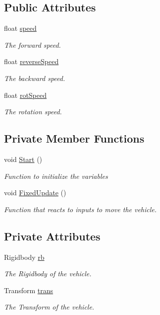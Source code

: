 \subsection*{Public Attributes}
\begin{DoxyCompactItemize}
\item 
float \hyperlink{classControls_a13ff9c0c0ed45cd20148f4040d1c2f2a}{speed}
\begin{DoxyCompactList}\small\item\em The forward speed.\end{DoxyCompactList}\item 
float \hyperlink{classControls_aab98d4d54ba3250567d610f72ce8d3a0}{reverse\+Speed}
\begin{DoxyCompactList}\small\item\em The backward speed.\end{DoxyCompactList}\item 
float \hyperlink{classControls_a63e757e67ec9fa27315c0ed36dd192e1}{rot\+Speed}
\begin{DoxyCompactList}\small\item\em The rotation speed.\end{DoxyCompactList}\end{DoxyCompactItemize}
\subsection*{Private Member Functions}
\begin{DoxyCompactItemize}
\item 
void \hyperlink{classControls_a649999d032808915ff6eb765abbc00ea}{Start} ()
\begin{DoxyCompactList}\small\item\em Function to initialize the variables \end{DoxyCompactList}\item 
void \hyperlink{classControls_a0ed8795b9204c879238f5acffaacfa0c}{Fixed\+Update} ()
\begin{DoxyCompactList}\small\item\em Function that reacts to inputs to move the vehicle. \end{DoxyCompactList}\end{DoxyCompactItemize}
\subsection*{Private Attributes}
\begin{DoxyCompactItemize}
\item 
Rigidbody \hyperlink{classControls_a723b624e75a9d0fdbb9f37f30fc6a4b4}{rb}
\begin{DoxyCompactList}\small\item\em The Rigidbody of the vehicle.\end{DoxyCompactList}\item 
Transform \hyperlink{classControls_acd54abd65fdcf81b4119211423583f59}{trans}
\begin{DoxyCompactList}\small\item\em The Transform of the vehicle.\end{DoxyCompactList}\end{DoxyCompactItemize}


